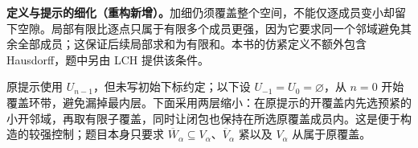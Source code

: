 \documentclass[../../main.tex]{subfiles}%
\begin{document}
\begin{remark}
\textbf{定义与提示的细化（重构新增）。}加细仍须覆盖整个空间，不能仅逐成员变小却留下空隙。局部有限比逐点只属于有限多个成员更强，因为它要求同一个邻域避免其余全部成员；这保证后续局部求和为有限和。本书的仿紧定义不额外包含 Hausdorff，题中另由 LCH 提供该条件。

原提示使用 $U_{n-1}$，但未写初始下标约定；以下设 $U_{-1}=U_0=\varnothing$，从 $n=0$ 开始覆盖环带，避免漏掉最内层。下面采用两层缩小：在原提示的开覆盖内先选预紧的小开邻域，再取有限子覆盖，同时让闭包也保持在所选原覆盖成员内。这是便于构造的较强控制；题目本身只要求 $\overline W_\alpha\subseteq V_\alpha$、$\overline V_\alpha$ 紧以及 $V_\alpha$ 从属于原覆盖。
\end{remark}
\end{document}
